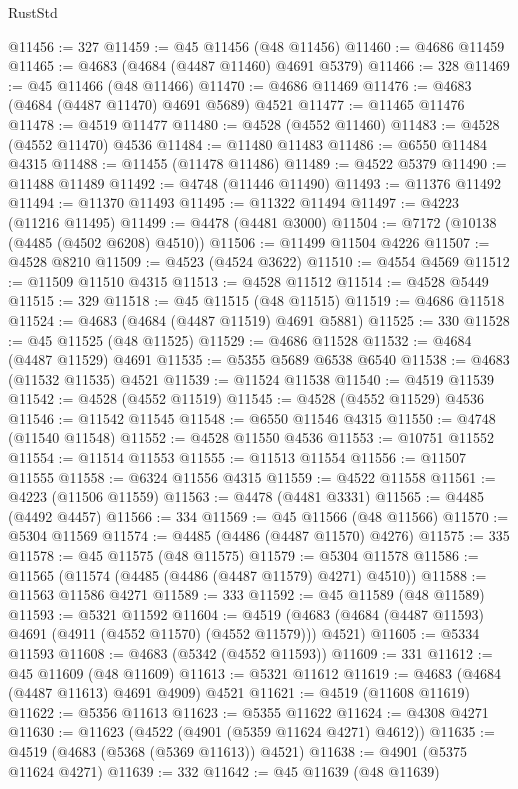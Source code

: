 \begin{lexlean}{RustStd}
\begin{coremodule}
@11456 := 327
@11459 := @45 @11456 (@48 @11456)
@11460 := @4686 @11459
@11465 := @4683 (@4684 (@4487 @11460) @4691 @5379)
@11466 := 328
@11469 := @45 @11466 (@48 @11466)
@11470 := @4686 @11469
@11476 := @4683 (@4684 (@4487 @11470) @4691 @5689) @4521
@11477 := @11465 @11476
@11478 := @4519 @11477
@11480 := @4528 (@4552 @11460)
@11483 := @4528 (@4552 @11470) @4536
@11484 := @11480 @11483
@11486 := @6550 @11484 @4315
@11488 := @11455 (@11478 @11486)
@11489 := @4522 @5379
@11490 := @11488 @11489
@11492 := @4748 (@11446 @11490)
@11493 := @11376 @11492
@11494 := @11370 @11493
@11495 := @11322 @11494
@11497 := @4223 (@11216 @11495)
@11499 := @4478 (@4481 @3000)
@11504 := @7172 (@10138 (@4485 (@4502 @6208) @4510))
@11506 := @11499 @11504 @4226
@11507 := @4528 @8210
@11509 := @4523 (@4524 @3622)
@11510 := @4554 @4569
@11512 := @11509 @11510 @4315
@11513 := @4528 @11512
@11514 := @4528 @5449
@11515 := 329
@11518 := @45 @11515 (@48 @11515)
@11519 := @4686 @11518
@11524 := @4683 (@4684 (@4487 @11519) @4691 @5881)
@11525 := 330
@11528 := @45 @11525 (@48 @11525)
@11529 := @4686 @11528
@11532 := @4684 (@4487 @11529) @4691
@11535 := @5355 @5689 @6538 @6540
@11538 := @4683 (@11532 @11535) @4521
@11539 := @11524 @11538
@11540 := @4519 @11539
@11542 := @4528 (@4552 @11519)
@11545 := @4528 (@4552 @11529) @4536
@11546 := @11542 @11545
@11548 := @6550 @11546 @4315
@11550 := @4748 (@11540 @11548)
@11552 := @4528 @11550 @4536
@11553 := @10751 @11552
@11554 := @11514 @11553
@11555 := @11513 @11554
@11556 := @11507 @11555
@11558 := @6324 @11556 @4315
@11559 := @4522 @11558
@11561 := @4223 (@11506 @11559)
@11563 := @4478 (@4481 @3331)
@11565 := @4485 (@4492 @4457)
@11566 := 334
@11569 := @45 @11566 (@48 @11566)
@11570 := @5304 @11569
@11574 := @4485 (@4486 (@4487 @11570) @4276)
@11575 := 335
@11578 := @45 @11575 (@48 @11575)
@11579 := @5304 @11578
@11586 := @11565 (@11574 (@4485 (@4486 (@4487 @11579) @4271) @4510))
@11588 := @11563 @11586 @4271
@11589 := 333
@11592 := @45 @11589 (@48 @11589)
@11593 := @5321 @11592
@11604 := @4519 (@4683 (@4684 (@4487 @11593) @4691 (@4911 (@4552 @11570) (@4552 @11579))) @4521)
@11605 := @5334 @11593
@11608 := @4683 (@5342 (@4552 @11593))
@11609 := 331
@11612 := @45 @11609 (@48 @11609)
@11613 := @5321 @11612
@11619 := @4683 (@4684 (@4487 @11613) @4691 @4909) @4521
@11621 := @4519 (@11608 @11619)
@11622 := @5356 @11613
@11623 := @5355 @11622
@11624 := @4308 @4271
@11630 := @11623 (@4522 (@4901 (@5359 @11624 @4271) @4612))
@11635 := @4519 (@4683 (@5368 (@5369 @11613)) @4521)
@11638 := @4901 (@5375 @11624 @4271)
@11639 := 332
@11642 := @45 @11639 (@48 @11639)

\end{coremodule}
\end{lexlean}
